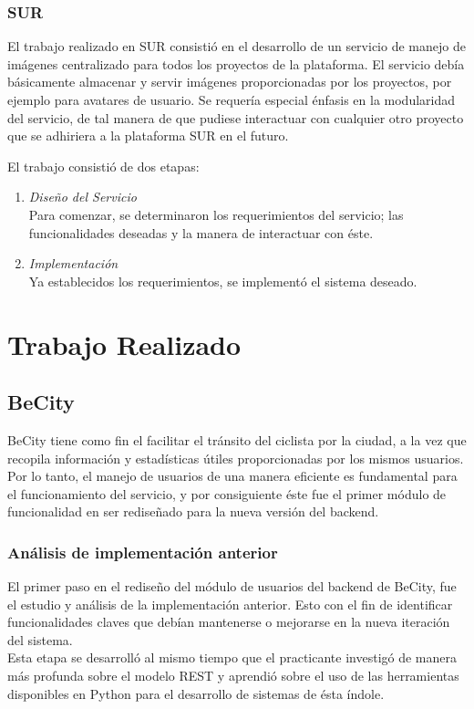 \documentclass[11pt,letterpaper]{article}
\begin{document}
\subsubsection{SUR}

El trabajo realizado en SUR consistió en el desarrollo de un servicio de manejo de imágenes centralizado para todos los proyectos de la plataforma. El servicio debía básicamente almacenar y servir imágenes proporcionadas por los proyectos, por ejemplo para avatares de usuario. Se requería especial énfasis en la modularidad del servicio, de tal manera de que pudiese interactuar con cualquier otro proyecto que se adhiriera a la plataforma SUR en el futuro.

El trabajo consistió de dos etapas:
\begin{enumerate}
    \item \emph{Diseño del Servicio}\\ Para comenzar, se determinaron los requerimientos del servicio; las funcionalidades deseadas y la manera de interactuar con éste.
    \item \emph{Implementación}\\ Ya establecidos los requerimientos, se implementó el sistema deseado.
\end{enumerate}

\newpage
\section{Trabajo Realizado}

\subsection{BeCity}

BeCity tiene como fin el facilitar el tránsito del ciclista por la ciudad, a la vez que recopila información y estadísticas útiles proporcionadas por los mismos usuarios. Por lo tanto, el manejo de usuarios de una manera eficiente es fundamental para el funcionamiento del servicio, y por consiguiente éste fue el primer módulo de funcionalidad en ser rediseñado para la nueva versión del backend.

\subsubsection{Análisis de implementación anterior}

El primer paso en el rediseño del módulo de usuarios del backend de BeCity, fue el estudio y análisis de la implementación anterior. Esto con el fin de identificar funcionalidades claves que debían mantenerse o mejorarse en la nueva iteración del sistema.\\
Esta etapa se desarrolló al mismo tiempo que el practicante investigó de manera más profunda sobre el modelo REST y aprendió sobre el uso de las herramientas disponibles en Python para el desarrollo de sistemas de ésta índole.\\
\end{document}
